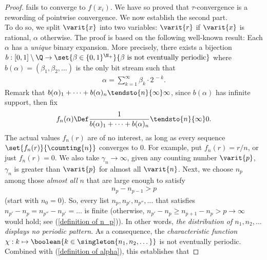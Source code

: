 \begin{proof}
%
fails to converge to 
$f(x_i)$.
We have so proved that 
%
  $\tau$-convergence is a rewording of pointwise convergence.
%
We now establish the second part. \\%
\newline\noindent
To do so, we split $\varit{x}$ into two variables: %
$\varit{r}$ if $\varit{x}$ is rational, ${\alpha}$ otherwise.
%
The proof is based on the following well-known result: Each $\alpha$ %
has a {\it unique} binary expansion. %
More precisely, there exists a bijection %
%
$b:[0, 1] \setminus \Q \to %
\set{\beta \in \{0, 1\}^{\N_+}}{\beta \text{ is not eventually periodic}}$ %
%
where %
$b(\alpha) = (\beta_1, \beta_2, \dots)$ %
is the only bit stream such that %
%
  \begin{align}
    \label{definition of alpha}
    \alpha = \sum_{k=1}^\infty \beta_k \cdot 2^{\,\minus k}.
  \end{align}
%
Remark that %
%
$b(\alpha)_1 + \dots + b(\alpha)_n \tendsto{n}{\infty}\infty$, %
%
since %
%
$b(\alpha)$
%
has infinite support, then fix %
%
  \begin{equation}
    \label{definition of f_n(alpha)}
    f_n(\alpha)\Def %
    \frac{1}{b(\alpha)_1+\cdots+ b(\alpha)_n} \tendsto{n}{\infty} 0.
  \end{equation}
%
The actual values $f_n(r)$ are of no interest, %
as long as every sequence $\set{f_n(r)}{\counting{n}}$ converges to $0$. %
For example, put $f_n(r) = r/n$, or just $f_n(r) = 0$. %
We also take %
%
  $\gamma_n \longrightarrow \infty$, \ie %
%
given any counting number $\varit{p}$, %
$\gamma_{n}$ is greater than $\varit{p}$ for almost all $\varit{n}$.
%
Next, we choose $n_{p}$ among those \textit{almost all} $\mathit{n}$ that are 
large enough to satisfy 
%
  \begin{align}
    \label{definition of n_p}
    n_p - n_{p-1} > p
  \end{align}
%
(start with $n_0=0$).
%
So, every list %
%
  $n_{p}, n_{p'}, n_{p''}, \dots $ %
%
that satisfies %
%
  $n_{p'}- n_{p} = n_{p''} - n_{p'} = \dots$ %
%
is finite %
(otherwise, %
    $n_{p'}-n_{p} \geq n_{p+1} - n_{p}  
    > p 
    \rightarrow  \infty %
    $
would hold; see (\ref{definition of n_p})).
In other words, {\it the distribution of %
%
$\mathit{n_1, n_2, \dots}$ %
%
displays no periodic pattern}. %
As a consequence, the {\it characteristic function} %
  $\chi: k\mapsto \boolean{k \in \singleton{n_1, n_2, \dots}}$ %
is not eventually periodic. %
Combined with (\ref{definition of alpha}), this establishes that 
%
\def\xgamma{\alpha_{\gamma}}

\end{proof}
